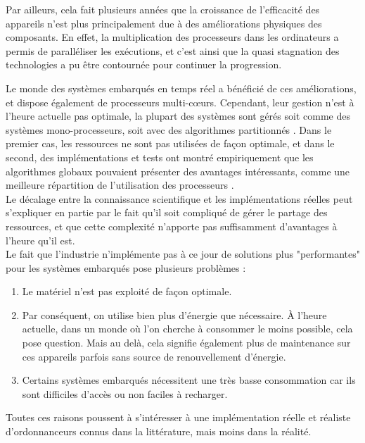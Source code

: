\documentclass[11pt,a4paper,oneside]{report}
\begin{document}
Par ailleurs, cela fait plusieurs années que la croissance de l'efficacité des appareils n'est plus 
principalement due à des améliorations physiques des composants. 
En effet, la multiplication des processeurs dans les ordinateurs a permis
de paralléliser les exécutions, et c'est ainsi que la quasi stagnation des 
technologies a pu être contournée pour continuer la progression.


Le monde des systèmes embarqués en temps réel a bénéficié de ces améliorations, 
et dispose également de processeurs multi-c\oe{}urs. Cependant, leur gestion n'est 
à l'heure actuelle pas optimale, la plupart des systèmes sont  
gérés soit comme des systèmes mono-processeurs, soit avec des algorithmes partitionnés \cite{paolillo_new_nodate}. 
Dans le premier cas, les ressources ne sont pas utilisées de façon optimale, 
et dans le second, des implémentations et tests ont montré empiriquement 
que les algorithmes globaux pouvaient présenter des avantages intéressants, comme 
une meilleure répartition de l'utilisation des processeurs \cite{baker_analysis_2005}. 
\\ 

Le décalage entre la connaissance scientifique et les implémentations réelles 
peut s'expliquer en partie par le fait qu'il soit compliqué de gérer le partage des ressources, 
et que cette complexité n'apporte pas suffisamment d'avantages à l'heure qu'il est.\\

Le fait que l'industrie n'implémente pas à ce jour de solutions plus "performantes" 
pour les systèmes embarqués pose plusieurs problèmes :
\begin{enumerate}
	\item Le matériel n'est pas exploité de façon optimale.
	\item Par conséquent, on utilise bien plus d'énergie que nécessaire. 
	À l'heure actuelle, dans un monde où l'on cherche à consommer le moins possible, 
	cela pose question. Mais au delà, cela signifie également plus de maintenance 
	sur ces appareils parfois sans source de renouvellement d'énergie.
	\item Certains systèmes embarqués nécessitent une très basse consommation car 
	ils sont difficiles d'accès ou non faciles à recharger.
\end{enumerate}

Toutes ces raisons poussent à s'intéresser à une implémentation réelle et réaliste 
d'ordonnanceurs connus dans la littérature, mais moins dans la réalité.
\end{document}
